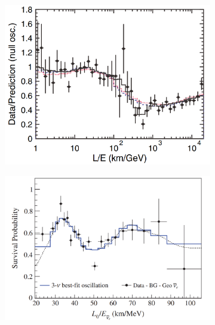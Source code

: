\begin{figure}
    \centering
    \begin{subfigure}{0.48\textwidth}
        \centering
        \includegraphics[width=0.95\linewidth]{1_NeutrinoTheory/Figs/sk_atmospherics_LE_plot.png}
        \caption{}
        \label{fig:LE_plot_SK_atmos}
    \end{subfigure}
    \begin{subfigure}{0.48\textwidth}
        \centering
        \includegraphics[width=0.95\linewidth]{1_NeutrinoTheory/Figs/kamland_reactor_LE_plot.png}
        \caption{}
        \label{fig:LE_plot_KamLAND_antinu}
    \end{subfigure}
    \begin{subfigure}{0.48\textwidth}
        \centering

\end{subfigure}
\end{figure}
